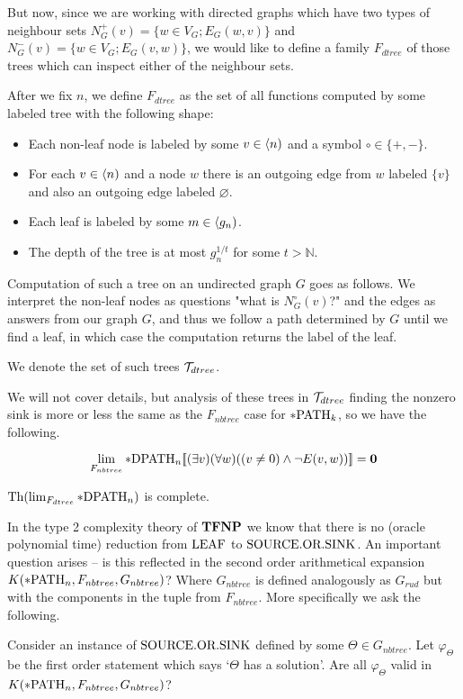 But now, since we are working with directed graphs which have two types of neighbour sets $N_G^+(v)=\{w\in V_G;E_G(w,v)\}$ and $N_G^-(v)=\{w\in V_G;E_G(v,w)\}$, we would like to define a family $F_{dtree}$ of those trees which can inspect either of the neighbour sets.

\begin{defi}
After we fix $n$, we define $F_{dtree}$ as the set of all functions computed by some labeled tree with the following shape:

\begin{itemize}
\item Each non-leaf node is labeled by some $v\in\langle n)$ and a symbol $\circ\in\{+,-\}$. 
\item For each $v \in \langle n)$ and a node $w$ there is an outgoing edge from $w$ labeled $\{v\}$ and also an outgoing edge labeled $\varnothing$.
\item Each leaf is labeled by some $m\in \langle g_n)$.
\item The depth of the tree is at most $g_n^{1/t}$ for some $t>\mathbb{N}$.
\end{itemize}

Computation of such a tree on an undirected graph $G$ goes as follows. We interpret the non-leaf nodes as questions "what is $N_G^\circ(v)$?" and the edges as answers from our graph $G$, and thus we follow a path determined by $G$ until we find a leaf, in which case the computation returns the label of the leaf.

We denote the set of such trees $\mathcal{T}_{dtree}$.
\end{defi}

We will not cover details, but analysis of these trees in $\mathcal{T}_{dtree}$ finding the nonzero sink is more or less the same as the $F_{nbtree}$ case for $*\text{PATH}_k$, so we have the following.

\begin{thrm}
\[\lim_{F_{nbtree}}*\text{DPATH}_n[\![(\exists v)(\forall w)((v\not=0)\land \lnot E(v,w))]\!]=\textbf{0}\]
\end{thrm}

\begin{crll}\label{crllpDPATH}
$\text{Th}(\lim_{F_{dtree}}*\text{DPATH}_n)$ is complete.
\end{crll}

In the type 2 complexity theory of $\textbf{TFNP}$ we know that there is no (oracle polynomial time) reduction from $\text{LEAF}$ to $\text{SOURCE.OR.SINK}$. An important question arises -- is this reflected in the second order arithmetical expansion $K(*\text{PATH}_n,F_{nbtree},G_{nbtree})$? Where $G_{nbtree}$ is defined analogously as $G_{rud}$ but with the components in the tuple from $F_{nbtree}$. More specifically we ask the following.

\begin{ques}
Consider an instance of $\text{SOURCE.OR.SINK}$ defined by some $\Theta\in G_{nbtree}$. Let $\varphi_\Theta$ be the first order statement which says `$\Theta$ has a solution'. Are all $\varphi_\Theta$ valid in $K(*\text{PATH}_n,F_{nbtree},G_{nbtree})$?
\end{ques}
